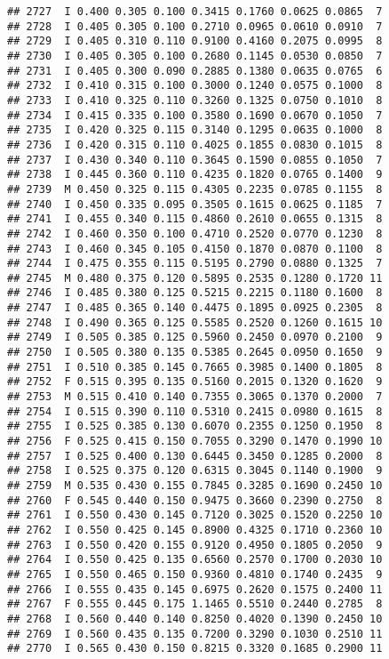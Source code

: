 \documentclass[
]{article}
\begin{document}
\begin{verbatim}
## 2727  I 0.400 0.305 0.100 0.3415 0.1760 0.0625 0.0865  7
## 2728  I 0.405 0.305 0.100 0.2710 0.0965 0.0610 0.0910  7
## 2729  I 0.405 0.310 0.110 0.9100 0.4160 0.2075 0.0995  8
## 2730  I 0.405 0.305 0.100 0.2680 0.1145 0.0530 0.0850  7
## 2731  I 0.405 0.300 0.090 0.2885 0.1380 0.0635 0.0765  6
## 2732  I 0.410 0.315 0.100 0.3000 0.1240 0.0575 0.1000  8
## 2733  I 0.410 0.325 0.110 0.3260 0.1325 0.0750 0.1010  8
## 2734  I 0.415 0.335 0.100 0.3580 0.1690 0.0670 0.1050  7
## 2735  I 0.420 0.325 0.115 0.3140 0.1295 0.0635 0.1000  8
## 2736  I 0.420 0.315 0.110 0.4025 0.1855 0.0830 0.1015  8
## 2737  I 0.430 0.340 0.110 0.3645 0.1590 0.0855 0.1050  7
## 2738  I 0.445 0.360 0.110 0.4235 0.1820 0.0765 0.1400  9
## 2739  M 0.450 0.325 0.115 0.4305 0.2235 0.0785 0.1155  8
## 2740  I 0.450 0.335 0.095 0.3505 0.1615 0.0625 0.1185  7
## 2741  I 0.455 0.340 0.115 0.4860 0.2610 0.0655 0.1315  8
## 2742  I 0.460 0.350 0.100 0.4710 0.2520 0.0770 0.1230  8
## 2743  I 0.460 0.345 0.105 0.4150 0.1870 0.0870 0.1100  8
## 2744  I 0.475 0.355 0.115 0.5195 0.2790 0.0880 0.1325  7
## 2745  M 0.480 0.375 0.120 0.5895 0.2535 0.1280 0.1720 11
## 2746  I 0.485 0.380 0.125 0.5215 0.2215 0.1180 0.1600  8
## 2747  I 0.485 0.365 0.140 0.4475 0.1895 0.0925 0.2305  8
## 2748  I 0.490 0.365 0.125 0.5585 0.2520 0.1260 0.1615 10
## 2749  I 0.505 0.385 0.125 0.5960 0.2450 0.0970 0.2100  9
## 2750  I 0.505 0.380 0.135 0.5385 0.2645 0.0950 0.1650  9
## 2751  I 0.510 0.385 0.145 0.7665 0.3985 0.1400 0.1805  8
## 2752  F 0.515 0.395 0.135 0.5160 0.2015 0.1320 0.1620  9
## 2753  M 0.515 0.410 0.140 0.7355 0.3065 0.1370 0.2000  7
## 2754  I 0.515 0.390 0.110 0.5310 0.2415 0.0980 0.1615  8
## 2755  I 0.525 0.385 0.130 0.6070 0.2355 0.1250 0.1950  8
## 2756  F 0.525 0.415 0.150 0.7055 0.3290 0.1470 0.1990 10
## 2757  I 0.525 0.400 0.130 0.6445 0.3450 0.1285 0.2000  8
## 2758  I 0.525 0.375 0.120 0.6315 0.3045 0.1140 0.1900  9
## 2759  M 0.535 0.430 0.155 0.7845 0.3285 0.1690 0.2450 10
## 2760  F 0.545 0.440 0.150 0.9475 0.3660 0.2390 0.2750  8
## 2761  I 0.550 0.430 0.145 0.7120 0.3025 0.1520 0.2250 10
## 2762  I 0.550 0.425 0.145 0.8900 0.4325 0.1710 0.2360 10
## 2763  I 0.550 0.420 0.155 0.9120 0.4950 0.1805 0.2050  9
## 2764  I 0.550 0.425 0.135 0.6560 0.2570 0.1700 0.2030 10
## 2765  I 0.550 0.465 0.150 0.9360 0.4810 0.1740 0.2435  9
## 2766  I 0.555 0.435 0.145 0.6975 0.2620 0.1575 0.2400 11
## 2767  F 0.555 0.445 0.175 1.1465 0.5510 0.2440 0.2785  8
## 2768  I 0.560 0.440 0.140 0.8250 0.4020 0.1390 0.2450 10
## 2769  I 0.560 0.435 0.135 0.7200 0.3290 0.1030 0.2510 11
## 2770  I 0.565 0.430 0.150 0.8215 0.3320 0.1685 0.2900 11

\end{verbatim}
\end{document}
